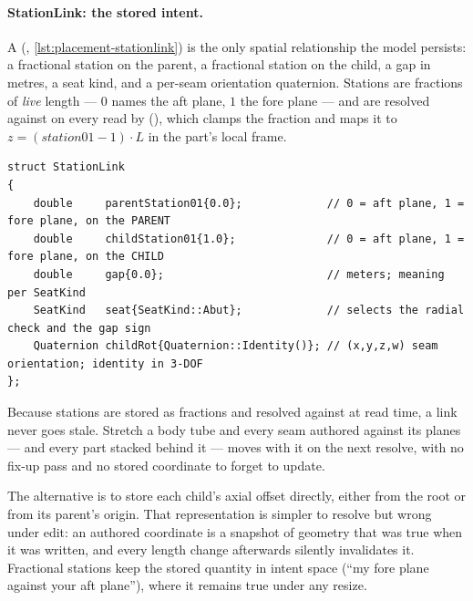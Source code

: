 \paragraph{StationLink: the stored intent.}
A  (, \cref{lst:placement-stationlink}) is
the only spatial relationship the model persists: a fractional station on the parent, a fractional
station on the child, a gap in metres, a seat kind, and a per-seam orientation quaternion. Stations
are fractions of \emph{live} length --- $0$ names the aft plane, $1$ the fore plane --- and are
resolved against  on every read by 
(), which clamps the fraction and maps it to
$z = (\mathit{station01} - 1) \cdot L$ in the part's local \zfwd{} frame.

\begin{listing}[htbp]
\begin{verbatim}
struct StationLink
{
    double     parentStation01{0.0};             // 0 = aft plane, 1 = fore plane, on the PARENT
    double     childStation01{1.0};              // 0 = aft plane, 1 = fore plane, on the CHILD
    double     gap{0.0};                         // meters; meaning per SeatKind
    SeatKind   seat{SeatKind::Abut};             // selects the radial check and the gap sign
    Quaternion childRot{Quaternion::Identity()}; // (x,y,z,w) seam orientation; identity in 3-DOF
};
\end{verbatim}
\caption{ (). The default-constructed
link means ``child fore plane abuts parent aft plane'' --- the natural nose $\to$ body $\to$ tail
build order, so a design assembled with default links stacks aft without any authored
numbers.}\label{lst:placement-stationlink}
\end{listing}

\begin{keyinsight}
Because stations are stored as fractions and resolved against  at read time, a
link never goes stale. Stretch a body tube and every seam authored against its planes --- and every
part stacked behind it --- moves with it on the next resolve, with no fix-up pass and no stored
coordinate to forget to update.
\end{keyinsight}

\begin{rejected}
The alternative is to store each child's axial offset directly, either from the root or from its
parent's origin. That representation is simpler to resolve but wrong under edit: an authored
coordinate is a snapshot of geometry that was true when it was written, and every length change
afterwards silently invalidates it. Fractional stations keep the stored quantity in intent space
(``my fore plane against your aft plane''), where it remains true under any resize.
\end{rejected}

